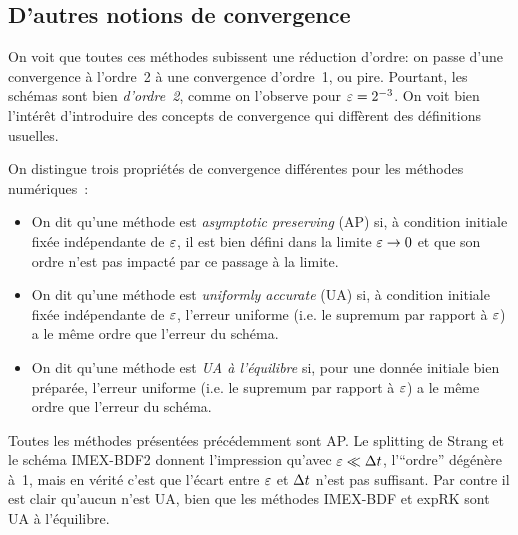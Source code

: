 \subsection*{D'autres notions de convergence}

On voit que toutes ces méthodes subissent une réduction d'ordre: on passe d'une convergence à l'ordre~2 à une convergence d'ordre~1, ou pire. Pourtant, les schémas sont bien \textit{d'ordre~2}, comme on l'observe pour $\varepsilon = 2^{-3}$. On voit bien l'intérêt d'introduire des concepts de convergence qui diffèrent des définitions usuelles. 

\begin{FRdefinition*}
    On distingue trois propriétés de convergence différentes pour les méthodes numériques~:
\begin{itemize}
    \item On dit qu'une méthode est \textit{asymptotic preserving} (AP) si, à condition initiale fixée indépendante de $\varepsilon$, il est bien défini dans la limite $\varepsilon \rightarrow 0$ et que son ordre n'est pas impacté par ce passage à la limite.
    \item On dit qu'une méthode est \textit{uniformly accurate} (UA) si, à condition initiale fixée indépendante de $\varepsilon$, l'erreur uniforme (i.e. le supremum par rapport à $\varepsilon$) a le même ordre que l'erreur du schéma.
    \item On dit qu'une méthode est \textit{UA à l'équilibre} si, pour une donnée initiale bien préparée, l'erreur uniforme (i.e. le supremum par rapport à $\varepsilon$) a le même ordre que l'erreur du schéma.
\end{itemize}
\end{FRdefinition*}


Toutes les méthodes présentées précédemment sont AP. Le splitting de Strang et le schéma IMEX-BDF2 donnent l'impression qu'avec $\varepsilon \ll \Delta t$, l'\enquote{ordre} dégénère à~1, mais en vérité c'est que l'écart entre $\varepsilon$ et $\Delta t$ n'est pas suffisant. Par contre il est clair qu'aucun n'est UA, bien que les méthodes IMEX-BDF et expRK sont UA à l'équilibre.
